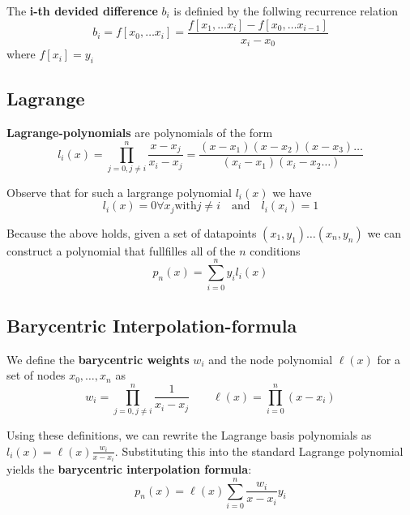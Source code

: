 \begin{definition}
    The \textbf{i-th devided difference} $b_i$ is definied by the follwing recurrence relation
    $$b_i  = f[x_0, \dots x_i] =  \frac{f[x_1, \dots x_i] - f[x_0, \dots x_{i-1}]}{x_i - x_0}$$
    where $f[x_i] = y_i$ 
\end{definition}

\subsection{Lagrange}

\begin{definition}
    \textbf{Lagrange-polynomials} are polynomials of the form
    $$l_i(x) = \prod_{j=0, j\neq i}^{n} \frac{x - x_j}{x_i - x_j} = \frac{(x-x_1) (x-x_2) (x-x_3) \dots}{(x_i-x_1) (x_i-x_2 \dots)}$$
\end{definition}

\begin{theorem}
    Observe that for such a largrange polynomial $l_i(x)$ we have
    $$l_i(x) = 0 \forall x_j \text{with} j\neq i \quad \text{and} \quad l_i(x_i) = 1$$
\end{theorem}

\begin{theorem}
    Because the above holds, given a set of datapoints $(x_1, y_1)  \dots (x_n, y_n)$ we can construct a polynomial that fullfilles all of the $n$ conditions
    $$p_n(x) = \sum_{i=0}^{n} y_i l_i(x)$$
\end{theorem}

\subsection{Barycentric Interpolation-formula}

\begin{definition}
    We define the \textbf{barycentric weights} $w_i$ and the node polynomial $\ell(x)$ for a set of nodes $x_0, \dots, x_n$ as
    $$w_i = \prod_{j=0, j \neq i}^{n} \frac{1}{x_i - x_j} \quad \quad \ell(x) = \prod_{i=0}^{n} (x - x_i)$$
\end{definition}

\begin{theorem}
    Using these definitions, we can rewrite the Lagrange basis polynomials as $l_i(x) = \ell(x) \frac{w_i}{x - x_i}$. Substituting this into the standard Lagrange polynomial yields the \textbf{barycentric interpolation formula}:
    $$p_n(x) = \ell(x) \sum_{i=0}^{n} \frac{w_i}{x - x_i} y_i$$
\end{theorem}

